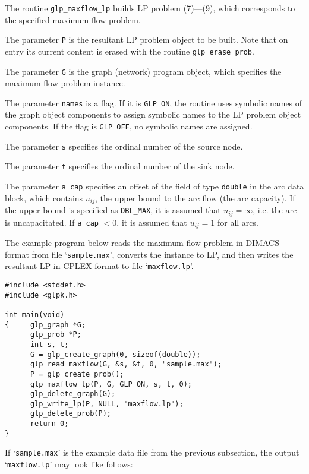 \documentclass[11pt]{report}
\def\para#1{\noindent{\bf#1}}
\def\description{\para{Description}}
\begin{document}
\description

The routine \verb|glp_maxflow_lp| builds LP problem (7)---(9), which
corresponds to the specified maximum flow problem.

The parameter \verb|P| is the resultant LP problem object to be built.
Note that on entry its current content is erased with the routine
\verb|glp_erase_prob|.

The parameter \verb|G| is the graph (network) program object, which
specifies the maximum flow problem instance.

The parameter \verb|names| is a flag. If it is \verb|GLP_ON|, the
routine uses symbolic names of the graph object components to assign
symbolic names to the LP problem object components. If the flag is
\verb|GLP_OFF|, no symbolic names are assigned.

The parameter \verb|s| specifies the ordinal number of the source node.

The parameter \verb|t| specifies the ordinal number of the sink node.

The parameter \verb|a_cap| specifies an offset of the field of type
\verb|double| in the arc data block, which contains $u_{ij}$, the upper
bound to the arc flow (the arc capacity). If the upper bound is
specified as \verb|DBL_MAX|, it is assumed that $u_{ij}=\infty$, i.e.
the arc is uncapacitated. If \verb|a_cap| $<0$, it is assumed that
$u_{ij}=1$ for all arcs.

\para{Example}

The example program below reads the maximum flow problem in DIMACS
format from file `\verb|sample.max|', converts the instance to LP, and
then writes the resultant LP in CPLEX format to file
`\verb|maxflow.lp|'.

\begin{footnotesize}
\begin{verbatim}
#include <stddef.h>
#include <glpk.h>

int main(void)
{     glp_graph *G;
      glp_prob *P;
      int s, t;
      G = glp_create_graph(0, sizeof(double));
      glp_read_maxflow(G, &s, &t, 0, "sample.max");
      P = glp_create_prob();
      glp_maxflow_lp(P, G, GLP_ON, s, t, 0);
      glp_delete_graph(G);
      glp_write_lp(P, NULL, "maxflow.lp");
      glp_delete_prob(P);
      return 0;
}
\end{verbatim}
\end{footnotesize}

If `\verb|sample.max|' is the example data file from the previous
subsection, the output `\verb|maxflow.lp|' may look like follows:
\end{document}
